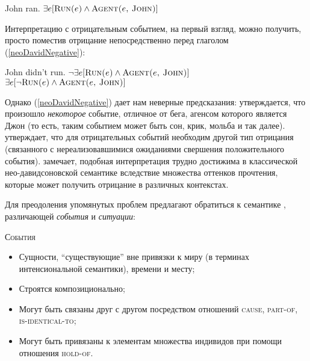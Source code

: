 \documentclass[a4paper, titlepage]{article}
\begin{document}
\begin{exe}
    \ex \label{neoDavidOrdinary} \begin{xlist}
        \ex John ran.
        \ex $ \exists e [\textsc{Run(}e\textsc{)} \land \textsc{Agent(}e\textsc{, John)}] $
    \end{xlist}
\end{exe}

Интерпретацию с отрицательным событием, на первый взгляд, можно получить, просто поместив отрицание непосредственно перед глаголом (\ref{neoDavidNegative}):

\begin{exe}
    \ex \label{neoDavidOrdinary} \begin{xlist}
        \ex John didn't run.
        \ex $ \lnot \exists e [\textsc{Run(}e\textsc{)} \land \textsc{Agent(}e\textsc{, John)}] $
        \ex \label{neoDavidNegative} $ \exists e [\lnot\textsc{Run(}e\textsc{)} \land \textsc{Agent(}e\textsc{, John)}] $
    \end{xlist}
\end{exe}

Однако (\ref{neoDavidNegative}) дает нам неверные предсказания: утверждается, что произошло \textit{некоторое} событие, отличное от бега, агенсом которого является Джон (то есть, таким событием может быть сон, крик, мольба и так далее). \citep{arkadiev2015negative} утверждает, что для отрицательных событий необходим другой тип отрицания (связанного с нереализовавшимися ожиданиями свершения положительного события). \citep{arkadiev2015negative} замечает, подобная интерпретация трудно достижима в классической нео-давидсоновской семантике вследствие множества оттенков прочтения, которые может получить отрицание в различных контекстах. 

\medskip

Для преодоления упомянутых проблем \citep{fabergas2017building} предлагают обратиться к семантике \citep{ramchand201Xauxiliaries}, различающей \textit{события} и \textit{ситуации}:

\begin{exe}
    \ex \textsc{События}
        \begin{itemize}
            \item Сущности, ``существующие'' вне привязки к миру (в терминах интенсиональной семантики), времени и месту;
            \item Строятся композиционально;
            \item Могут быть связаны друг с другом посредством отношений \textsc{cause}, \textsc{part-of}, \textsc{is-identical-to};
            \item Могут быть привязаны к элементам множества индивидов при помощи отношения \textsc{hold-of}.
        \end{itemize}
\end{exe}
\end{document}
